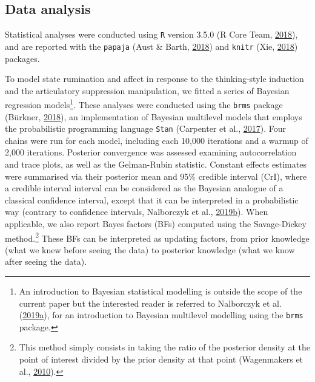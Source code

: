 \documentclass[a4paper,12pt,twoside,openright,oldfontcommands,final]{memoir}
\let\rmarkdownfootnote\footnote%
\def\footnote{\protect\rmarkdownfootnote}
\begin{document}
\hypertarget{data-analysis-3}{%
\subsection{Data analysis}\label{data-analysis-3}}

Statistical analyses were conducted using \texttt{R} version 3.5.0 (R Core Team, \protect\hyperlink{ref-R-base}{2018}), and are reported with the \texttt{papaja} (Aust \& Barth, \protect\hyperlink{ref-R-papaja}{2018}) and \texttt{knitr} (Xie, \protect\hyperlink{ref-R-knitr}{2018}) packages.

To model state rumination and affect in response to the thinking-style induction and the articulatory suppression manipulation, we fitted a series of Bayesian regression models\footnote{An introduction to Bayesian statistical modelling is outside the scope of the current paper but the interested reader is referred to Nalborczyk et al. (\protect\hyperlink{ref-nalborczyk_introduction_2019}{2019}\protect\hyperlink{ref-nalborczyk_introduction_2019}{a}), for an introduction to Bayesian multilevel modelling using the \texttt{brms} package.}. These analyses were conducted using the \texttt{brms} package (Bürkner, \protect\hyperlink{ref-R-brms}{2018}), an implementation of Bayesian multilevel models that employs the probabilistic programming language \texttt{Stan} (Carpenter et al., \protect\hyperlink{ref-carpenter_stan_2017}{2017}). Four chains were run for each model, including each 10,000 iterations and a warmup of 2,000 iterations. Posterior convergence was assessed examining autocorrelation and trace plots, as well as the Gelman-Rubin statistic. Constant effects estimates were summarised via their posterior mean and 95\% credible interval (CrI), where a credible interval interval can be considered as the Bayesian analogue of a classical confidence interval, except that it can be interpreted in a probabilistic way (contrary to confidence intervals, Nalborczyk et al., \protect\hyperlink{ref-nalborczyk_pragmatism_2019}{2019}\protect\hyperlink{ref-nalborczyk_pragmatism_2019}{b}). When applicable, we also report Bayes factors (BFs) computed using the Savage-Dickey method.\footnote{This method simply consists in taking the ratio of the posterior density at the point of interest divided by the prior density at that point (Wagenmakers et al., \protect\hyperlink{ref-wagenmakers_bayesian_2010}{2010}).} These BFs can be interpreted as updating factors, from prior knowledge (what we knew before seeing the data) to posterior knowledge (what we know after seeing the data).
\end{document}
